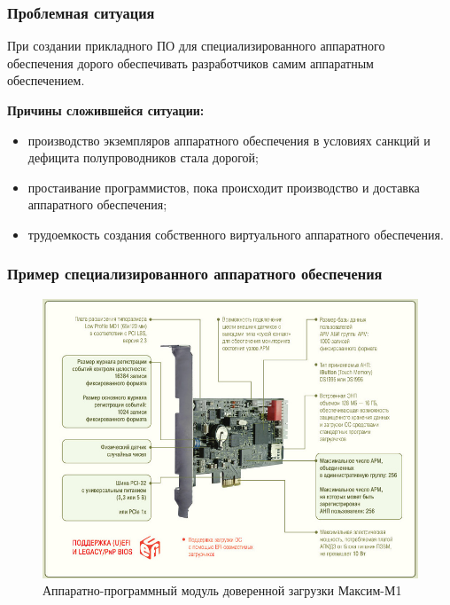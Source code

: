 \begin{frame}%
    \frametitle{Проблемная ситуация}

    При создании прикладного ПО для специализированного аппаратного обеспечения
    дорого обеспечивать разработчиков самим аппаратным обеспечением.

    \textbf{Причины сложившейся ситуации:}
    \begin{itemize}
        \item производство экземпляров аппаратного обеспечения в условиях санкций и дефицита полупроводников стала дорогой;
        \item простаивание программистов, пока происходит производство и доставка аппаратного обеспечения;
        \item трудоемкость создания собственного виртуального аппаратного обеспечения.
    \end{itemize}
\end{frame}


\begin{frame}%
    \frametitle{Пример специализированного аппаратного обеспечения}
    \begin{figure}[!htbp]
        \centering
        \begin{adjustbox}{max totalsize={0.8\textwidth}{0.8\textheight}}
            \includegraphics[]{images/apmdz.png}
        \end{adjustbox}
        \caption{Аппаратно-программный модуль доверенной загрузки Максим-М1}
    \end{figure}
\end{frame}


